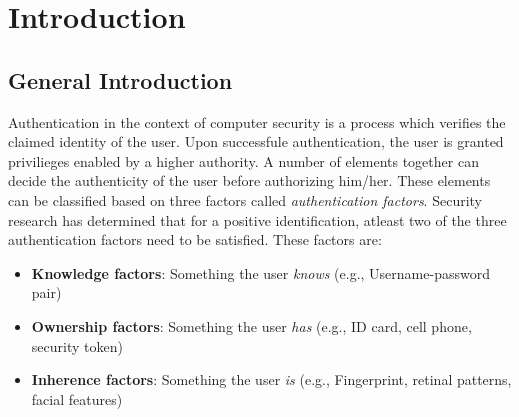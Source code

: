 \documentclass[12pt]{article}			%
\begin{document}
\newpage				%
\tableofcontents			%



\newpage				%

\section{ Introduction }	%


\subsection{ General Introduction }

Authentication in the context of computer security is a process which verifies the claimed identity of the user. Upon successfule authentication, the user is granted privilieges enabled by a higher authority. A number of elements together can decide the authenticity of the user before authorizing him/her. These elements can be classified based on three factors called \emph{authentication factors}.
Security research has determined that for a positive identification, atleast two of the three authentication factors need to be satisfied.
These factors are:

\begin{itemize}
	\item \textbf{Knowledge factors}: Something the user \emph{knows} (e.g., Username-password pair)
	\item \textbf{Ownership factors}: Something the user \emph{has} (e.g., ID card, cell phone, security token)
	\item \textbf{Inherence factors}: Something the user \emph{is} (e.g., Fingerprint, retinal patterns, facial features)
\end{itemize}
\end{document}
